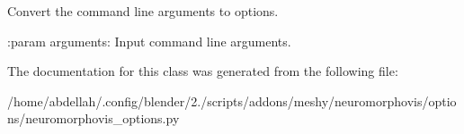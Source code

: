 \begin{DoxyVerb}Convert the command line arguments to options.

:param arguments:
    Input command line arguments.
\end{DoxyVerb}
 

The documentation for this class was generated from the following file\+:\begin{DoxyCompactItemize}
\item 
/home/abdellah/.\+config/blender/2./scripts/addons/meshy/neuromorphovis/options/neuromorphovis\+\_\+options.\+py\end{DoxyCompactItemize}
